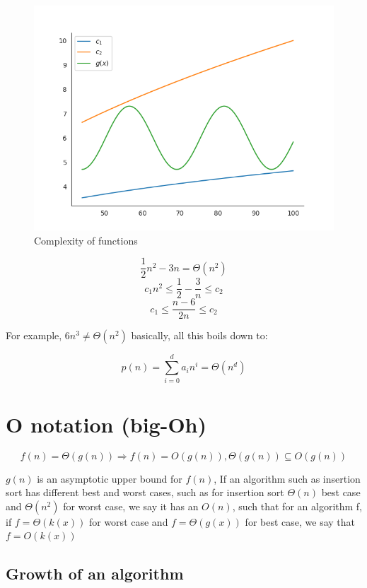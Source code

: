 \documentclass[11pt]{book}
\begin{document}
\begin{figure}[h!]
	\includegraphics[scale=0.7]{figures/02_complexity.png}
	\caption{Complexity of functions}
\end{figure}

\[ \frac{1}{2}n^2 - 3n = \Theta(n^2)\]
\[ c_1n^2 \leq \frac{1}{2} - \frac{3}{n} \leq c_2\]
\[c_1 \leq \frac{n - 6}{2n} \leq c_2\]

For example, $6n^3 \neq \Theta(n^2)$ basically, all this boils down to:

\begin{equation}
p(n) = \sum_{i = 0}^d a_i n^i = \Theta(n^d)
\end{equation}

\section{O notation (big-Oh)}

\begin{equation}
f(n) = \Theta(g(n)) \Rightarrow f(n) = O(g(n)), \Theta(g(n)) \subseteq O(g(n))
\end{equation}


$g(n)$ is an asymptotic upper bound for $f(n)$, If an algorithm such as insertion sort has different best and worst cases, such as for insertion sort $\Theta(n)$ best case and $\Theta(n^2)$ for worst case, we say it has an $O(n)$, such that for an algorithm f, if $f = \Theta(k(x))$ for worst case and $f = \Theta(g(x))$ for best case, we say that $f = O(k(x))$

\subsection{Growth of an algorithm}
\end{document}
